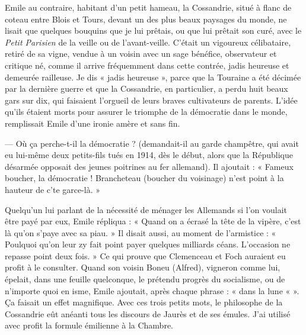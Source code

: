 \documentclass[french,twoside]{book} %
\begin{document}
Emile au contraire, habitant d’un petit hameau, la Cossandrie, situé à flanc de coteau entre Blois et Tours, devant un des plus beaux paysages du monde, ne lisait que quelques bouquins que je lui prêtais, ou que lui prêtait son curé, avec le {\itshape Petit Parisien} de la veille ou de l’avant-veille. C’était un vigoureux célibataire, retiré de sa vigne, vendue à un voisin avec un sage bénéfice, observateur et critique né, comme il arrive fréquemment dans cette contrée, jadis heureuse et demeurée railleuse. Je dis « jadis heureuse », parce que la Touraine a été décimée par la dernière guerre et que la Cossandrie, en particulier, a perdu huit beaux gars sur dix, qui faisaient l’orgueil de leurs braves cultivateurs de parents. L’idée qu’ils étaient morts pour assurer le triomphe de la démocratie dans le monde, remplissait Emile d’une ironie amère et sans fin.\par
— Où ça perche-t-il la démocratie ? (demandait-il au garde champêtre, qui avait eu lui-même deux petits-fils tués en 1914, dès le début, alors que la République désarmée opposait des jeunes poitrines au fer allemand). Il ajoutait : « Fameux boucher, la démocratie ! Brancheteau (boucher du voisinage) n’est point à la hauteur de c’te garce-là. »\par
Quelqu’un lui parlant de la nécessité de ménager les Allemands si l’on voulait être payé par eux, Emile répliqua : « Quand on a écrasé la tête de la vipère, c’est là qu’on s’paye avec sa piau. » Il disait aussi, au moment de l’armistice : « Poulquoi qu’on leur zy fait point payer quelques milliards céans. L’occasion ne repasse point deux fois. » Ce qui prouve que Clemenceau et Foch auraient eu profit à le consulter. Quand son voisin Boneu (Alfred), vigneron comme lui, épelait, dans une feuille quelconque, le prétendu progrès du socialisme, ou de n’importe quoi en isme, Emile ajoutait, après chaque phrase : « dans la lune « ». Ça faisait un effet magnifique. Avec ces trois petits mots, le philosophe de la Cossandrie eût anéanti tous les discours de Jaurès et de ses émules. J’ai utilisé avec profit la formule émilienne à la Chambre.\par
\end{document}
